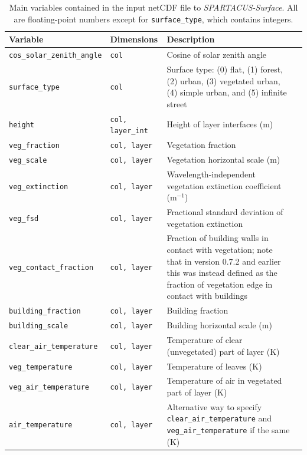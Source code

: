 \documentclass[a4,oneside]{article}
\def\tablesetup{\rowcolors{2}{light-gray}{light-gray}\small}
\def\codesize{\small}
\def\codetabsize{\footnotesize}
\def\spsurf{\emph{SPARTACUS-Surface}}
\def\code#1{{\codesize\texttt{#1}}}
\def\codetab#1{{\codetabsize\texttt{#1}}}
\begin{document}
\pagebreak
{
\tablesetup
\begin{longtable}{llLp{8cm}}%
\caption{\label{tab:invar}Main variables contained in the input netCDF
  file to \spsurf. All are floating-point numbers except for
  \code{surface\_type}, which contains integers.}\\
%
\hline
Variable & Dimensions & Description \\
\hline
\codetab{cos\_solar\_zenith\_angle} & \codetab{col} & Cosine of solar zenith angle \\
\codetab{surface\_type} & \codetab{col} & Surface type: (0) flat, (1) forest, (2) urban, (3) vegetated urban, (4) simple urban, and (5) infinite street \\
\codetab{height} & \codetab{col, layer\_int} & Height of layer interfaces (m) \\
\codetab{veg\_fraction} & \codetab{col, layer} & Vegetation fraction \\
\codetab{veg\_scale} & \codetab{col, layer} & Vegetation horizontal scale (m) \\
\codetab{veg\_extinction} & \codetab{col, layer} & Wavelength-independent vegetation extinction coefficient (m$^{-1}$) \\
\codetab{veg\_fsd} & \codetab{col, layer} & Fractional standard deviation of vegetation extinction \\
\codetab{veg\_contact\_fraction} & \codetab{col, layer} & Fraction of building walls in contact with vegetation; note that in version 0.7.2 and earlier this was instead defined as the fraction of vegetation edge in contact with buildings \\
%
\codetab{building\_fraction} & \codetab{col, layer} & Building fraction \\
\codetab{building\_scale} & \codetab{col, layer} & Building horizontal scale (m) \\
%
\codetab{clear\_air\_temperature} & \codetab{col, layer} & Temperature of clear (unvegetated) part of layer (K) \\
\codetab{veg\_temperature} & \codetab{col, layer} & Temperature of leaves (K) \\
\codetab{veg\_air\_temperature} & \codetab{col, layer} & Temperature of air in vegetated part of layer (K) \\
\codetab{air\_temperature} & \codetab{col, layer} & Alternative way to specify \codetab{clear\_air\_temperature} and \codetab{veg\_air\_temperature} if the same (K) \\

\end{longtable}}
\end{document}
